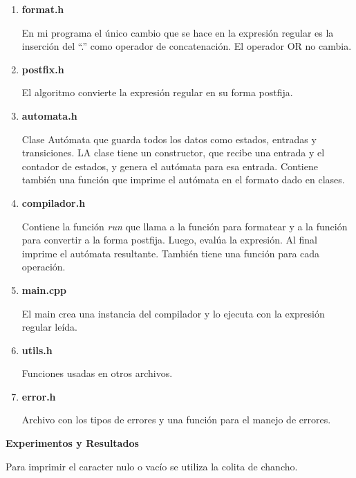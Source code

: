 \documentclass[a4paper,12pt]{article}
\begin{document}
\begin{enumerate}
 \item \textbf{format.h}
 
 En mi programa el único cambio que se hace en la expresión regular es la inserción del ``.'' como operador de concatenación. El operador OR no cambia.


 \item \textbf{postfix.h}
 
 El algoritmo convierte la expresión regular en su forma postfija.
 


 \item \textbf{automata.h}

 Clase Autómata que guarda todos los datos como estados, entradas y transiciones. LA clase tiene un constructor, que recibe
 una entrada y el contador de estados, y genera el autómata para esa entrada. Contiene también una función
 que imprime el autómata en el formato dado en clases.
 



 \item \textbf{compilador.h}
 
 Contiene la función \textit{run} que llama a la función para formatear y a la función para convertir a la forma postfija.
 Luego, evalúa la expresión. Al final imprime el autómata resultante. También tiene una función para cada operación.
 

 \item \textbf{main.cpp}
 
 El main crea una instancia del compilador y lo ejecuta con la expresión regular leída.
 

 
 \item \textbf{utils.h}

 Funciones usadas en otros archivos.
 

 \item \textbf{error.h}
 
 Archivo con los tipos de errores y una función para el manejo de errores.
 

\end{enumerate}

\begin{large}
 \textbf{Experimentos y Resultados}
\end{large}

 Para imprimir el caracter nulo o vacío se utiliza la colita de chancho.
\end{document}
